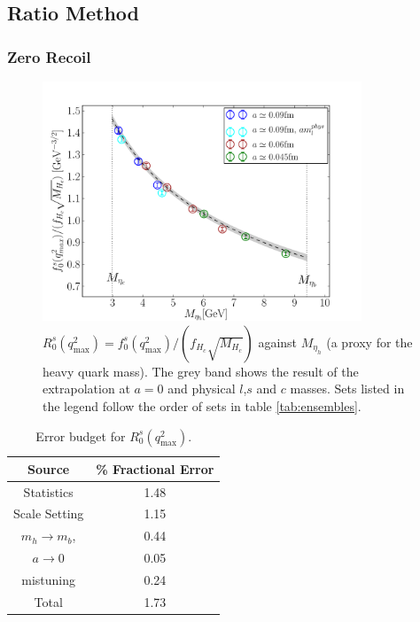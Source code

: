 \subsection{Ratio Method}
\label{sec:ratiomethod}

\subsubsection{Zero Recoil}

\begin{figure}[htb!]
  \begin{center}
  \hspace{-10pt}
  \includegraphics[width=0.85\textwidth]{images/BsDs/ratio/f0fHc_vsmh.pdf}
  \caption{ $R_0^s(q^2_{\text{max}}) = f_0^s(q^2_{\text{max}})/(f_{H_c}\sqrt{M_{H_c}})$ against $M_{\eta_h}$ (a proxy for the heavy quark mass). The grey band shows the result of the extrapolation at $a=0$ and physical $l$,$s$ and $c$ masses. Sets listed in the legend follow the order of sets in table \ref{tab:ensembles}. \label{fig:ratioq2max}}
    \end{center}
\end{figure}

\begin{table}[htb!]
  \begin{center}
    \begin{tabular}{c c}
      \hline
      Source & \% Fractional Error \\ [0.5ex]
      \hline
      Statistics & 1.48  \\ [1ex]
      Scale Setting & 1.15  \\ [1ex]
      $m_h \to m_b$, & 0.44  \\ [1ex]
      $a\to 0$ & 0.05  \\ [1ex]
      mistuning & 0.24 \\ [1ex]
      \hline
      Total & 1.73 \\ [1ex]
      \hline
    \end{tabular}
  \end{center}
  \caption{Error budget for $R_0^s(q^2_{\text{max}})$. \label{ratioq2max_budget}}
\end{table}

